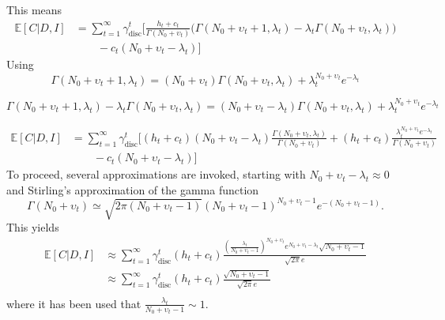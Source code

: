 This means
\begin{equation}
	\begin{split}
		\mathbb{E}[C|D,I] &= \sum_{t=1}^{\infty}\gamma_{\text{disc}}^{t} \bigg[\frac{h_t+c_t}{\Gamma(N_0+\upsilon_t)}\bigg(
		\Gamma(N_0+\upsilon_t+1,\lambda_t)-\lambda_t\Gamma(N_0+\upsilon_t,\lambda_t)
		\bigg)\\
		&\qquad- c_t(N_0 + \upsilon_t-\lambda_t)\bigg]
	\end{split}
\end{equation}
Using
\begin{equation}
	\Gamma(N_0+\upsilon_t+1,\lambda_t) = (N_0+\upsilon_t)\Gamma(N_0+\upsilon_t,\lambda_t)+\lambda_t^{N_0+\upsilon_t}e^{-\lambda_t}
\end{equation}


\begin{equation}
	\Gamma(N_0+\upsilon_t+1,\lambda_t)-\lambda_t\Gamma(N_0+\upsilon_t,\lambda_t) = (N_0+\upsilon_t-\lambda_t)\Gamma(N_0+\upsilon_t,\lambda_t)+\lambda_t^{N_0+\upsilon_t}e^{-\lambda_t}
\end{equation}

\begin{equation}
	\begin{split}
		\mathbb{E}[C|D,I] &= \sum_{t=1}^{\infty}\gamma_{\text{disc}}^{t} \bigg[
		(h_t+c_t)(N_0+\upsilon_t-\lambda_t)\frac{\Gamma(N_0+\upsilon_t,\lambda_t)}{\Gamma(N_0+\upsilon_t)}+(h_t+c_t)\frac{\lambda_t^{N_0+\upsilon_t}e^{-\lambda_t}}{\Gamma(N_0+\upsilon_t)}\\
		&\qquad- c_t(N_0 + \upsilon_t-\lambda_t)\bigg]
	\end{split}
\end{equation}
To proceed, several approximations are invoked, starting with $N_0+\upsilon_t-\lambda_t \approx 0$ and Stirling's approximation of the gamma function
\begin{equation}
	\Gamma(N_0+\upsilon_t)\simeq \sqrt{2\pi (N_0+\upsilon_t-1)}(N_0+\upsilon_t-1)^{N_0+\upsilon_t-1}e^{-(N_0+\upsilon_t-1)}.
\end{equation}
This yields
\begin{equation}
	\begin{split}
		\mathbb{E}[C|D,I] &\approx \sum_{t=1}^{\infty}\gamma_{\text{disc}}^{t} (h_t+c_t)\frac{(\frac{\lambda_t}{N_0+\upsilon_t-1})^{N_0+\upsilon_t}e^{N_0+\upsilon_t-\lambda_t}\sqrt{N_0+\upsilon_t-1}}{\sqrt{2\pi}e}\\
		&\approx \sum_{t=1}^{\infty}\gamma_{\text{disc}}^{t} (h_t+c_t)\frac{\sqrt{N_0+\upsilon_t-1}}{\sqrt{2\pi}e}\\
	\end{split}
\end{equation}
where it has been used that $\frac{\lambda_t}{N_0+\upsilon_t-1}\sim 1$.


